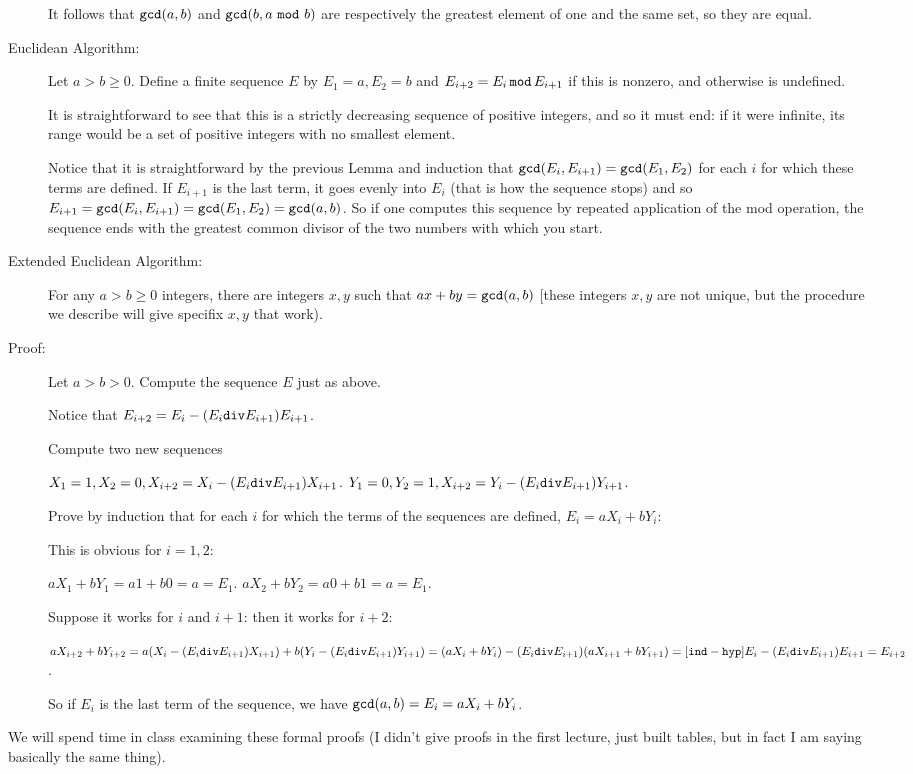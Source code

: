 \documentclass[12pt]{article}
\begin{document}
\begin{description}
It follows that ${\tt gcd}(a,b)$ and ${\tt gcd}(b,a\,\,{\tt mod}\,\,b)$ are respectively the greatest element of one and the same set, so they are equal.

\item[Euclidean Algorithm:]

Let $a>b\geq 0$.  Define a finite sequence $E$ by $E_1=a, E_2=b$ and $E_{i+2}= E_i \,{\tt mod}\, E_{i+1}$ if this is nonzero, and otherwise is undefined.

It is straightforward to see that this is a strictly decreasing sequence of positive integers, and so it must end:  if it were infinite, its range would be a set of positive integers with no smallest element.

Notice that it is straightforward by the previous Lemma and induction that ${\tt gcd}(E_i,E_{i+1}) = {\tt gcd}(E_1,E_2)$ for each $i$ for which these terms are defined.  If $E_{i+1}$ is the last term, it goes evenly into $E_i$ (that is how the sequence stops) and so $E_{i+1}={\tt gcd}(E_i,E_{i+1}) = {\tt gcd}(E_1,E_2)= {\tt gcd}(a,b)$.  So if one computes this sequence by repeated application of the mod operation, the sequence ends with the greatest common divisor of the two numbers with which you start.

\item[Extended Euclidean Algorithm:]  For any $a>b\geq0$ integers, there are integers $x,y$ such that $ax+by={\tt gcd}(a,b)$ [these integers $x,y$ are not unique, but the procedure we describe will give specifix $x,y$ that work).

\item[Proof:]  Let $a>b>0$.  Compute the sequence $E$ just as above.  

Notice that $E_{i+2}= E_i - (E_i {\tt div}E_{i+1})E_{i+1}$.

Compute two new sequences

$X_1=1, X_2=0, X_{i+2}= X_i - (E_i {\tt div}E_{i+1})X_{i+1}$.
$Y_1=0, Y_2=1, X_{i+2}= Y_i - (E_i {\tt div}E_{i+1})Y_{i+1}$.

Prove by induction that for each $i$ for which the terms of the sequences are defined, $E_i = aX_i + bY_i$:

This is obvious for $i=1,2$:

$aX_1+bY_1 = a1+b0 = a = E_1$.
$aX_2+bY_2 = a0+b1 = a = E_1$.

Suppose it works for $i$ and $i+1$:  then it works for $i+2$:

$aX_{i+2} +bY_{i+2} = a(X_i - (E_i {\tt div}E_{i+1})X_{i+1}) + b(Y_i - (E_i {\tt div}E_{i+1})Y_{i+1}) = (aX_i+bY_i) - (E_i {\tt div}E_{i+1})(aX_{i+1}+bY_{i+1}) =[{\tt ind-hyp}] E_i - (E_i {\tt div}E_{i+1})E_{i+1} = E_{i+2}$.

So if $E_i$ is the last term of the sequence, we have ${\tt gcd}(a,b)=E_i = aX_i +bY_i$.


\end{description}
We will spend time in class examining these formal proofs (I didn't give proofs in the first lecture, just built tables, but in fact I am saying basically the same thing).
\end{document}
